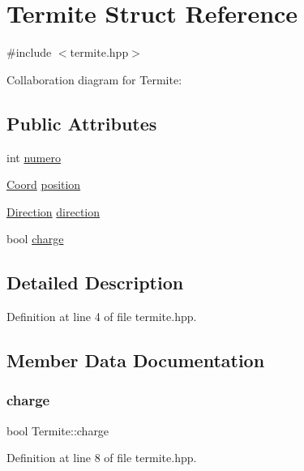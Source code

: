 \hypertarget{structTermite}{}\section{Termite Struct Reference}
\label{structTermite}


{\ttfamily \#include $<$termite.\+hpp$>$}



Collaboration diagram for Termite\+:
\subsection*{Public Attributes}
\begin{DoxyCompactItemize}
\item 
int \hyperlink{structTermite_a46adc25bf86ecdb46da04691190e680e}{numero}
\item 
\hyperlink{structCoord}{Coord} \hyperlink{structTermite_ab15e5a7c1ffc20223c2bf9d158509a06}{position}
\item 
\hyperlink{coord_8hpp_a224b9163917ac32fc95a60d8c1eec3aa}{Direction} \hyperlink{structTermite_ac9efb06efee1f16991a1d7fea6d38b83}{direction}
\item 
bool \hyperlink{structTermite_ab37ce8d57baf99929e64571ade6b985d}{charge}
\end{DoxyCompactItemize}


\subsection{Detailed Description}


Definition at line 4 of file termite.\+hpp.



\subsection{Member Data Documentation}
\mbox{\label{structTermite_ab37ce8d57baf99929e64571ade6b985d}} 
\subsubsection{\texorpdfstring{charge}{charge}}
{\footnotesize\ttfamily bool Termite\+::charge}



Definition at line 8 of file termite.\+hpp.

